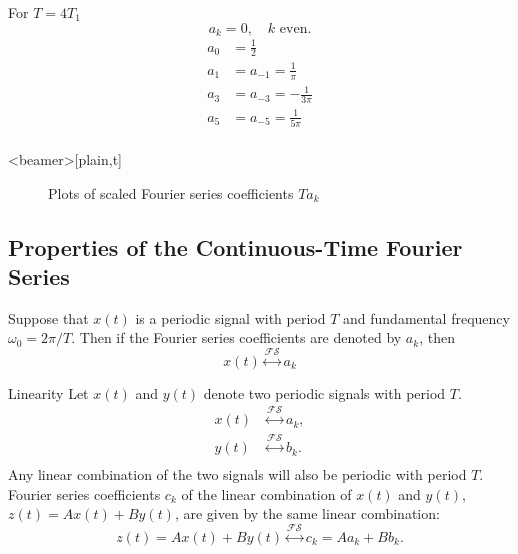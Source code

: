 \begin{frame}
    {
    For $T=4T_1$
    \begin{equation*}
        a_k = 0, \quad k \text{ even}.
    \end{equation*}
    \begin{align*}
        a_0 &= \frac{1}{2}\\
        a_1 &= a_{-1} = \frac{1}{\pi}\\
        a_3 &= a_{-3} = -\frac{1}{3\pi}\\
        a_5 &= a_{-5} = \frac{1}{5\pi}\\
    \end{align*}
    }
\end{frame}


\begin{frame}<beamer>[plain,t]
    \begin{figure}
      \centering
      
      \caption{Plots of scaled Fourier series coefficients $Ta_k$}\label{fi:example02_periodic_square_fs}
    \end{figure}
\end{frame}


\subsection{Properties of the Continuous-Time Fourier Series}

\begin{frame}
    Suppose that $x(t)$ is a periodic signal with period $T$ and fundamental frequency $\omega_0 = 2\pi/T$. Then if the Fourier series coefficients are denoted by $a_k$, then
    \begin{equation}
        x(t) \overset{\mathcal{FS}}{\longleftrightarrow} a_k
    \end{equation}
\end{frame}

\begin{frame}{Linearity}
    Let $x(t)$ and $y(t)$ denote two periodic signals with period $T$.
    \begin{align*}
        x(t) &\overset{\mathcal{FS}}{\longleftrightarrow} a_k,\\
        y(t) &\overset{\mathcal{FS}}{\longleftrightarrow} b_k.\\
    \end{align*}
    Any linear combination of the two signals will also be periodic with period $T$. Fourier series coefficients $c_k$ of the linear combination of $x(t)$ and $y(t)$, $z(t) = Ax(t) + By(t)$, are given by the same linear combination:
    \pause
    {
        \begin{equation}
            z(t) = Ax(t) + By(t)\overset{\mathcal{FS}}{\longleftrightarrow} c_k = Aa_k + Bb_k.
        \end{equation}
    }
\end{frame}

